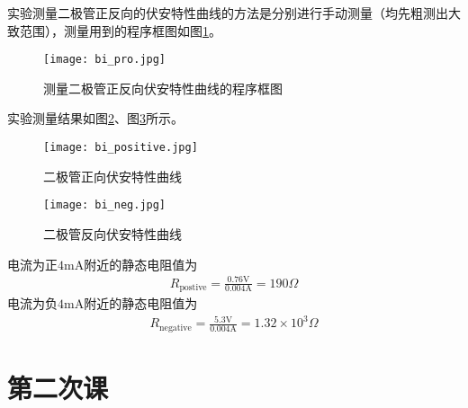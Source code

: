 \documentclass{ctexart}
\begin{document}
	实验测量二极管正反向的伏安特性曲线的方法是分别进行手动测量（均先粗测出大致范围），测量用到的程序框图如图\ref{kuangtu}。
	\begin{figure}[H]
		\centering
		\texttt{[image: bi\_pro.jpg]}
		\caption{测量二极管正反向伏安特性曲线的程序框图}
		\label{kuangtu}
	\end{figure}
	实验测量结果如图\ref{p}、图\ref{n}所示。
	\begin{figure}[H]
		\centering
		\texttt{[image: bi\_positive.jpg]}
		\caption{二极管正向伏安特性曲线}
		\label{p}
	\end{figure}
	\begin{figure}[H]
		\centering
		\texttt{[image: bi\_neg.jpg]}
		\caption{二极管反向伏安特性曲线}
		\label{n}
	\end{figure}
	电流为正$4\mathrm{mA}$附近的静态电阻值为
	\begin{align}
		R_{\text{postive}}=\frac{0.76\mathrm{V}}{0.004\mathrm{A}}=190\Omega
	\end{align}
	电流为负$4\mathrm{mA}$附近的静态电阻值为
	\begin{align}
		R_{\text{negative}}=\frac{5.3\mathrm{V}}{0.004\mathrm{A}}=1.32\times10^3\Omega
	\end{align}
	\section{第二次课}
\end{document}
